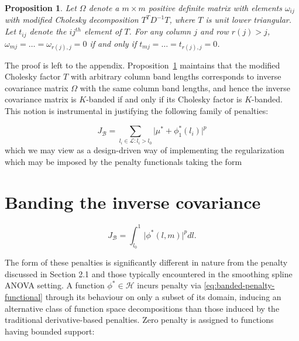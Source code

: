 \documentclass[12pt]{article}
\newtheorem{proposition}[theorem]{Proposition}
\theoremstyle{definition}
\begin{document}
\begin{proposition} \label{prop:cholesky-inverse-banding-equivalence}
Let $\Omega$ denote a $m \times m$ positive definite matrix with elements $\omega_{ij}$ with modified Cholesky decomposition $T^T D^{-1} T$, where $T$ is unit lower triangular. Let  $t_{ij}$ denote the $ij^{th}$ element of $T$. For any column $j$ and row $r\left(j\right) > j$,  $\omega_{mj} = \dots = \omega_{r\left(j\right),j} = 0$ if and only if  $t_{mj} = \dots = t_{r\left(j\right),j} = 0$.
\end{proposition}

The proof is left to the appendix. Proposition~\ref{prop:cholesky-inverse-banding-equivalence} maintains that the modified Cholesky factor $T$ with arbitrary column band lengths corresponds to inverse covariance matrix $\Omega$ with the same column band lengths, and hence the inverse covariance matrix is $K$-banded if and only if its Cholesky factor is $K$-banded. This notion is instrumental in justifying the following family of penalties:

\begin{equation} \label{eq:banded-penalty}
J_{\mathcal{B}} = \sum_{  l_i \in \mathcal{L}: l_i > l_0} \vert \mu^* + \phi^*_1\left(l_i\right) \vert^p 
\end{equation}
\noindent
which we may view as a design-driven way of implementing the regularization which may be imposed by the penalty functionals taking the form


\section{Banding the inverse covariance}


\begin{equation} \label{eq:banded-penalty-functional}
J_{\mathcal{B}} = \int_{ l_0}^1 \vert \phi^*\left(l,m\right) \vert^p dl.  
\end{equation}
\noindent

The form of these penalties is significantly different in nature from the penalty discussed in Section 2.1 and those typically encountered in the smoothing spline ANOVA setting. A function $\phi^* \in \mathcal{H}$ incurs penalty via \ref{eq:banded-penalty-functional} through its behaviour on only a  subset of its domain, inducing an alternative class of function space decompositions than those induced by the traditional derivative-based penalties. Zero penalty is assigned to functions having bounded support:
\end{document}
